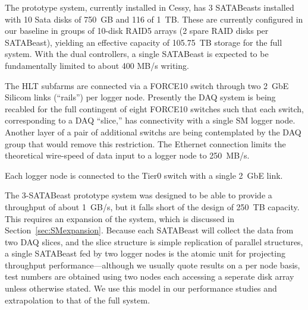 The prototype system, currently installed in Cessy, has
3 SATABeasts installed  with 10 Sata disks of 750~GB  and 116 of 1~TB.
These are currently configured in our baseline in groups of 10-disk RAID5 arrays 
(2 spare RAID disks per SATABeast), yielding an effective capacity of 105.75~TB storage
for the full system.
With the dual controllers, a single SATABeast is expected to be fundamentally 
limited to about 400 MB/s writing.

The HLT subfarms are connected via a FORCE10 switch through
two 2~GbE Silicom links (``rails'') per logger node.
Presently the DAQ system is being recabled for the full contingent of eight FORCE10 switches
such that each switch, corresponding to a DAQ ``slice,'' has connectivity with 
a single SM logger node.
Another layer of a pair of additional switchs are being contemplated by the DAQ group
that would remove this restriction.
The Ethernet connection limits the theoretical wire-speed of data input
to a logger node to 250~MB/s.

Each logger node is connected to the Tier0 switch with a single 2~GbE link.  

The 3-SATABeast prototype system was designed to be able to provide a throughput of about 1~GB/s,
but it falls short of the design of 250~TB capacity. 
This requires an expansion of the system, which is discussed in Section~\ref{sec:SMexpansion}.
Because each SATABeast will collect the data from two DAQ slices, and the slice structure
is simple replication of parallel structures, a single SATABeast fed by two logger nodes
is the atomic unit for projecting throughput performance---although we usually quote
results on a per node basis, test numbers are
obtained using two nodes each accessing a seperate disk array unless otherwise stated.
We use this model in our performance studies and extrapolation to that of the full system.

